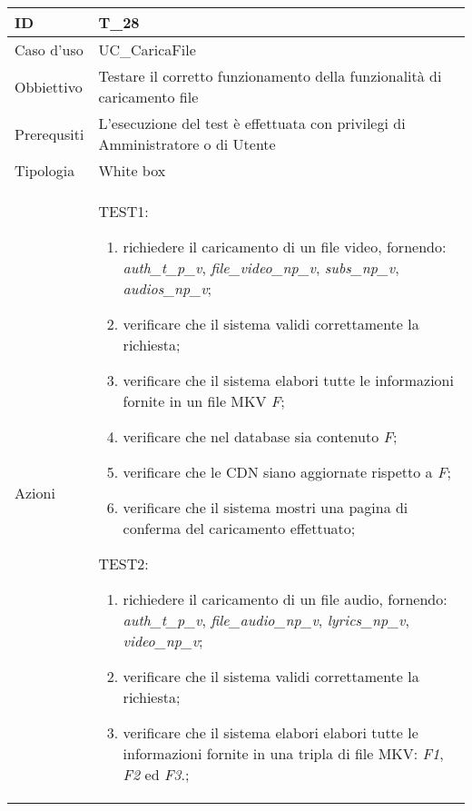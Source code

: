 \begin{table}[hb]
    \centering
    \begin{tabular}{ |p{2cm}|p{10cm}|  }
        \hline
        ID          & T\_28                                                                          \\\hline
        Caso d'uso  & UC\_CaricaFile                                                                 \\\hline
        Obbiettivo  & Testare il corretto funzionamento della funzionalità di caricamento file       \\\hline
        Prerequsiti & L'esecuzione del test è effettuata con privilegi di Amministratore o di Utente \\\hline
        Tipologia   & White box                                                                      \\\hline
        Azioni      &
        TEST1:
        \begin{enumerate}[nosep, topsep=0pt]
            \item richiedere il caricamento di un file video, fornendo: \emph{auth\_t\_p\_v}, \emph{file\_video\_np\_v}, \emph{subs\_np\_v}, \emph{audios\_np\_v};
            \item verificare che il sistema validi correttamente la richiesta;
            \item verificare che il sistema elabori tutte le informazioni fornite in un file MKV \emph{F};
            \item verificare che nel database sia contenuto \emph{F};
            \item verificare che le CDN siano aggiornate rispetto a \emph{F};
            \item verificare che il sistema mostri una pagina di conferma del caricamento effettuato;
        \end{enumerate}
        \vspace{0.5cm} TEST2:
        \begin{enumerate}[nosep, topsep=0pt]
            \item richiedere il caricamento di un file audio, fornendo: \emph{auth\_t\_p\_v}, \emph{file\_audio\_np\_v}, \emph{lyrics\_np\_v}, \emph{video\_np\_v};
            \item verificare che il sistema validi correttamente la richiesta;
            \item verificare che il sistema elabori elabori tutte le informazioni fornite in una tripla di file MKV: \emph{F1}, \emph{F2} ed \emph{F3}.;

\end{enumerate}
\end{tabular}
\end{table}

